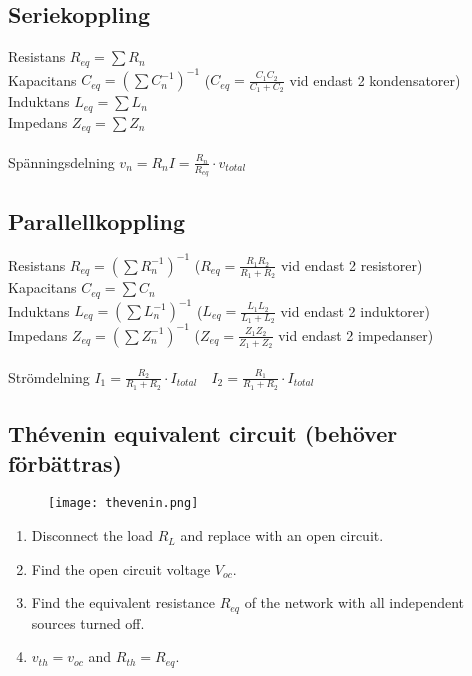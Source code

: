 \subsection{Seriekoppling}

Resistans $ R_{eq} = \sum R_n $
\\
Kapacitans  $ C_ {eq} = (\sum C_n ^{-1})^{-1} $ \tab (\( C_{eq} = \frac{C_1C_2}{C_1+C_2} \) vid endast 2 kondensatorer)
\\
Induktans $ L_{eq} = \sum L_n $
\\
Impedans \( Z_{eq} = \sum Z_n \)
\\ \\
Spänningsdelning \tab $ v_{n} = R_nI = \frac{R_n}{R_{eq}} \cdot v_{total} $

\subsection{Parallellkoppling}

Resistans $ R_{eq} = (\sum R_n^{-1})^{-1} $ \tab ($ R_{eq} = \frac{R_1R_2}{R_1 + R_2} $ vid endast 2 resistorer)
\\
Kapacitans $ C_{eq} = \sum C_n $
\\
Induktans $ L_{eq} = (\sum L_n^{-1})^{-1} $ \tab (\(L_{eq} = \frac{L_1L_2}{L_1+L_2}\) vid endast 2 induktorer)
\\
Impedans \( Z_{eq} = (\sum Z_n^{-1})^{-1} \) \tab (\( Z_{eq} = \frac{Z_1Z_2}{Z_1 + Z_2} \) vid endast 2 impedanser)
\\ \\
Strömdelning \tab $ I_1 = \frac{R_2}{R_1+R_2} \cdot I_{total} \quad I_2 = \frac{R_1}{R_1+R_2} \cdot I_{total} $

\subsection{Thévenin equivalent circuit (behöver förbättras)}

\begin{figure}[H]
    \centering
        \texttt{[image: thevenin.png]}
    \label{fig:thevenin}
\end{figure}

\begin{enumerate}
    \item Disconnect the load \(R_L\) and replace with an open circuit.
    \item Find the open circuit voltage \(V_{oc}\).
    \item Find the equivalent resistance \(R_{eq}\) of the network with all independent sources turned off.
    \item \(v_{th} = v_{oc}\) and \(R_{th} = R_{eq}\).
\end{enumerate}


